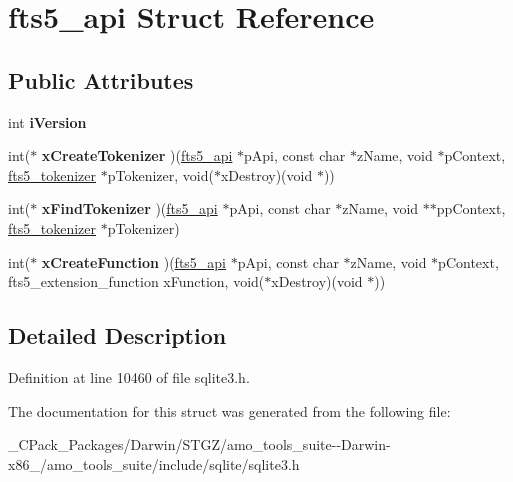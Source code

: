 \hypertarget{structfts5__api}{}\section{fts5\+\_\+api Struct Reference}
\label{structfts5__api}
\subsection*{Public Attributes}
\begin{DoxyCompactItemize}
\item 
\mbox{\label{structfts5__api_a3c338289abb33e1805da870172956a7c}} 
int {\bfseries i\+Version}
\item 
\mbox{\label{structfts5__api_a6cb9929558ff13c7b5a30292eb5aea7c}} 
int($\ast$ {\bfseries x\+Create\+Tokenizer} )(\hyperlink{structfts5__api}{fts5\+\_\+api} $\ast$p\+Api, const char $\ast$z\+Name, void $\ast$p\+Context, \hyperlink{structfts5__tokenizer}{fts5\+\_\+tokenizer} $\ast$p\+Tokenizer, void($\ast$x\+Destroy)(void $\ast$))
\item 
\mbox{\label{structfts5__api_aa232f72a0d7c7205fbd0dc6818e24aee}} 
int($\ast$ {\bfseries x\+Find\+Tokenizer} )(\hyperlink{structfts5__api}{fts5\+\_\+api} $\ast$p\+Api, const char $\ast$z\+Name, void $\ast$$\ast$pp\+Context, \hyperlink{structfts5__tokenizer}{fts5\+\_\+tokenizer} $\ast$p\+Tokenizer)
\item 
\mbox{\label{structfts5__api_aa932ba45865c10b49592920b9610db93}} 
int($\ast$ {\bfseries x\+Create\+Function} )(\hyperlink{structfts5__api}{fts5\+\_\+api} $\ast$p\+Api, const char $\ast$z\+Name, void $\ast$p\+Context, fts5\+\_\+extension\+\_\+function x\+Function, void($\ast$x\+Destroy)(void $\ast$))
\end{DoxyCompactItemize}


\subsection{Detailed Description}


Definition at line 10460 of file sqlite3.\+h.



The documentation for this struct was generated from the following file\+:\begin{DoxyCompactItemize}
\item 
\+\_\+\+C\+Pack\+\_\+\+Packages/\+Darwin/\+S\+T\+G\+Z/amo\+\_\+tools\+\_\+suite-\/-\/\+Darwin-\/x86\+\_/amo\+\_\+tools\+\_\+suite/include/sqlite/sqlite3.\+h\end{DoxyCompactItemize}
